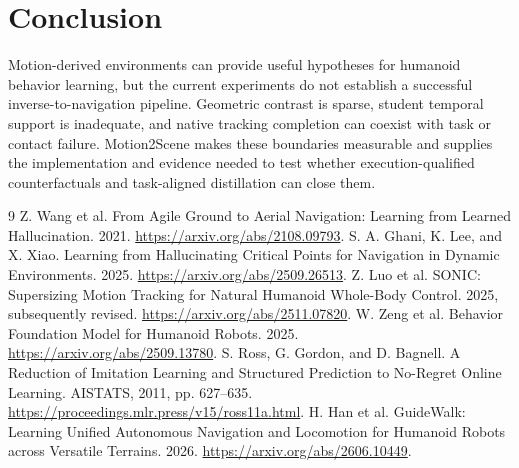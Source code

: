 \documentclass[10pt,twocolumn]{article}
\begin{document}
\section{Conclusion}
Motion-derived environments can provide useful hypotheses for humanoid behavior learning, but the current experiments do not establish a successful inverse-to-navigation pipeline. Geometric contrast is sparse, student temporal support is inadequate, and native tracking completion can coexist with task or contact failure. Motion2Scene makes these boundaries measurable and supplies the implementation and evidence needed to test whether execution-qualified counterfactuals and task-aligned distillation can close them.

\begin{thebibliography}{9}
 Z. Wang et al. From Agile Ground to Aerial Navigation: Learning from Learned Hallucination. 2021. \url{https://arxiv.org/abs/2108.09793}.
 S. A. Ghani, K. Lee, and X. Xiao. Learning from Hallucinating Critical Points for Navigation in Dynamic Environments. 2025. \url{https://arxiv.org/abs/2509.26513}.
 Z. Luo et al. SONIC: Supersizing Motion Tracking for Natural Humanoid Whole-Body Control. 2025, subsequently revised. \url{https://arxiv.org/abs/2511.07820}.
 W. Zeng et al. Behavior Foundation Model for Humanoid Robots. 2025. \url{https://arxiv.org/abs/2509.13780}.
 S. Ross, G. Gordon, and D. Bagnell. A Reduction of Imitation Learning and Structured Prediction to No-Regret Online Learning. AISTATS, 2011, pp. 627--635. \url{https://proceedings.mlr.press/v15/ross11a.html}.
 H. Han et al. GuideWalk: Learning Unified Autonomous Navigation and Locomotion for Humanoid Robots across Versatile Terrains. 2026. \url{https://arxiv.org/abs/2606.10449}.
\end{thebibliography}
\end{document}
